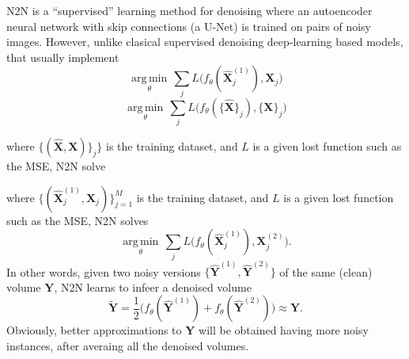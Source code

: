 N2N is a ``supervised'' learning method for denoising where an
autoencoder neural network with skip connections (a U-Net) is trained
on pairs of noisy images. However, unlike clasical supervised
denoising deep-learning based models, that usually implement
\cite{lehtinen2018noise2noise}
\begin{equation}
  \underset{\theta}{\operatorname{arg\,min}} \, \sum_j L \big(f_\theta(\hat{\mathbf X}_j^{(1)}), {\mathbf X}_j\big)
\end{equation}
\begin{equation}
  \underset{\theta}{\operatorname{arg\,min}} \, \sum_j L \big(f_\theta(\{\hat{\mathbf X}\}_j), \{{\mathbf X}\}_j\big)
\end{equation}

where $\{(\hat{\mathbf{X}}, \mathbf{X})\}_j\}$ is the training
dataset, and $L$ is a given lost function such as the MSE, N2N solve

where $\{(\hat{\mathbf X}_j^{(1)}, {\mathbf X}_j)\}_{j=1}^M$ is the training
dataset, and $L$ is a given lost function such as the MSE, N2N solves
\begin{equation}
  \underset{\theta}{\operatorname{arg\,min}} \, \sum_j L \big(f_\theta(\hat{\mathbf X}_j^{(1)}), {\mathbf X}_j^{(2)}\big).
\end{equation}
In other words, given two noisy versions
$\{\hat{\mathbf Y}^{(1)}, \hat{\mathbf Y}^{(2)}\}$ of the same (clean)
volume ${\mathbf Y}$, N2N learns to infeer a denoised volume
\begin{equation}
  \tilde{\mathbf Y}=\frac{1}{2}\big(f_\theta(\hat{\mathbf Y}^{(1)})+f_\theta(\hat{\mathbf Y}^{(2)})\big)\approx{\mathbf Y}.
\end{equation}
Obviously, better approximations to ${\mathbf Y}$ will be obtained
having more noisy instances, after averaing all the denoised volumes.

